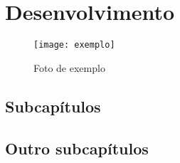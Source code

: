 \chapter{Desenvolvimento}

\blindtext

\begin{figure}[h]
	\centering
	\caption{Foto de exemplo}
	\texttt{[image: exemplo]}
	\label{fig:exemplo}
\end{figure}

\section{Subcapítulos}
\blindenumerate[10]

\section{Outro subcapítulos}
\blindtext[5]
